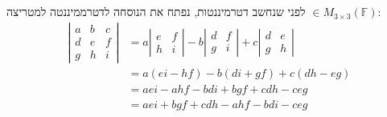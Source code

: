 \documentclass[]{article}
\newcommand\F         {\mathbb{F}}
\newcommand\detms[1]   {\sof{\begin{matrix}
            #1
\end{matrix}}}
\newcommand\sof[1]    {\left | #1 \right |}
\theoremstyle{definition}
\begin{document}
    \section{}
    לפני שנחשב דטרמיננטות, נפתח את הנוסחה לדטרממיננטה למטריצה $\in M_{3 \times 3}(\F)$: 
    \begin{align*}
        \detms{a & b & c \\ d & e & f \\ g & h & i} &= a\detms{e & f \\ h & i} - b\detms{d & f \\ g & i} + c\detms{d & e \\ g & h} \\
        &= a(ei - hf) - b(di + gf) + c(dh - eg) \\
        &= aei - ahf - bdi + bgf + cdh - ceg \\
        &= aei + bgf + cdh - ahf - bdi  - ceg
    \end{align*}
    
\end{document}
